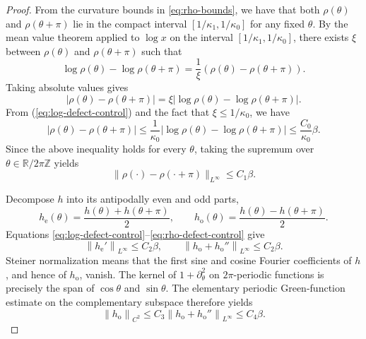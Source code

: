 \documentclass[10pt,a4paper]{amsart}
\begin{document}
\begin{proof}
From the curvature bounds in \eqref{eq:rho-bounds}, we have that
both $\rho(\theta)$ and $\rho(\theta+\pi)$ lie in the compact interval
$\left[1/\kappa_1, 1/\kappa_0\right]$ for any fixed $\theta$.
By the mean value theorem applied to $\log x$ on the interval $\left[1/\kappa_1, 1/\kappa_0\right]$,
there exists $\xi$ between $\rho(\theta)$ and $\rho(\theta+\pi)$ such that
\[
\log \rho(\theta) - \log \rho(\theta+\pi) = \frac{1}{\xi}(\rho(\theta)-\rho(\theta+\pi)).
\]
Taking absolute values gives
\[
\left|\rho(\theta)-\rho(\theta+\pi)\right| = \xi |\log \rho(\theta) - \log \rho(\theta+\pi)|.
\]
From (\ref{eq:log-defect-control}) and the fact that $\xi \le 1/\kappa_0$,
we have
\begin{equation*}
|\rho(\theta)-\rho(\theta+\pi)| \le \frac{1}{\kappa_0} |\log \rho(\theta) - \log\rho(\theta+\pi)|\le \frac{C_0}{\kappa_0} \beta.
\end{equation*}
Since the above inequality holds for every $\theta$, taking the supremum over
$\theta \in \mathbb{R}/2\pi\mathbb{Z}$ yields
\begin{equation}\label{eq:rho-defect-control}
 \|\rho(\cdot)-\rho(\cdot+\pi)\|_{L^\infty}
 \leq C_1\beta.
\end{equation}

Decompose $h$ into its antipodally even and odd parts,
\[
 h_{\mathrm{e}}(\theta)=\frac{h(\theta)+h(\theta+\pi)}{2},
 \qquad
 h_{\mathrm{o}}(\theta)=\frac{h(\theta)-h(\theta+\pi)}{2}.
\]
Equations \eqref{eq:log-defect-control}--\eqref{eq:rho-defect-control}
give
\begin{equation}\label{eq:even-odd-control}
 \left\|h_{\mathrm{e}}'\right\|_{L^\infty}\leq C_2\beta,
 \qquad
 \left\|h_{\mathrm{o}}+h_{\mathrm{o}}''\right\|_{L^\infty}\leq C_2\beta.
\end{equation}
Steiner normalization means that the first sine and cosine Fourier
coefficients of $h$, and hence of $h_{\mathrm{o}}$, vanish. The kernel of
$1+\partial_\theta^2$ on $2\pi$-periodic functions is precisely the span of
$\cos\theta$ and $\sin\theta$. The elementary periodic Green-function
estimate on the complementary subspace therefore yields
\begin{equation}\label{eq:odd-C2-control}
 \left\|h_{\mathrm{o}}\right\|_{C^2}\leq
 C_3\left\|h_{\mathrm{o}}+h_{\mathrm{o}}''\right\|_{L^\infty}
 \leq C_4\beta.
\end{equation}


\end{proof}
\end{document}
